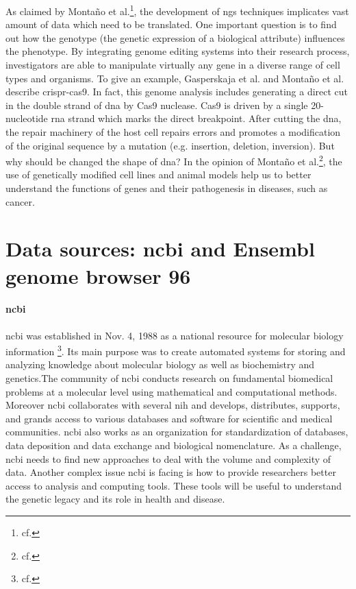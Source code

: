 As claimed by Monta\~{n}o et al.\footnote{cf.\autocite{montano_2018}}, the development of \ac{ngs} techniques implicates vast amount of data which need to be translated. One important question is to find out how the genotype (the genetic expression of a biological attribute) influences the phenotype. By integrating genome editing systems into their research process, investigators are able to manipulate virtually any gene in a diverse range of cell types and organisms.
To give an example, Gasperskaja et al. and Monta\~{n}o et al. describe \ac{crispr-cas9}. In fact, this genome analysis includes generating a direct cut in the double strand of \ac{dna} by Cas9 nuclease. Cas9 is driven by a single 20-nucleotide \ac{rna} strand which marks the direct breakpoint. After cutting the \ac{dna}, the repair machinery of the host cell repairs errors and promotes a modification of the original sequence by a mutation (e.g. insertion, deletion, inversion).
But why should be changed the shape of \ac{dna}? In the opinion of Monta\~{n}o et al.\footnote{cf.\autocite{montano_2018}}, the use of genetically modified cell lines and animal models help us to better understand the functions of genes and their pathogenesis in diseases, such as cancer.
   
\section{Data sources: \ac{ncbi} and Ensembl genome browser 96}\label{datasources}

\paragraph{\ac{ncbi}}

\ac{ncbi} was established in Nov. 4, 1988 as a national resource for molecular biology information \footnote{cf.\autocite{ncbi}}. Its main purpose was to create automated systems for storing and analyzing knowledge about molecular biology as well as biochemistry and genetics.The community of \ac{ncbi} conducts research on fundamental biomedical problems at a molecular level using mathematical and computational methods.
Moreover \ac{ncbi} collaborates with several \ac{nih} and develops, distributes, supports, and grands access to various databases and software for scientific and medical communities.
\ac{ncbi} also works as an organization for standardization of databases, data deposition and data exchange and biological nomenclature.
As a challenge, \ac{ncbi} needs to find new approaches to deal with the volume and complexity of data. Another complex issue \ac{ncbi} is facing is how to provide researchers better access to analysis and computing tools. These tools will be useful to understand the genetic legacy and its role in health and disease.

